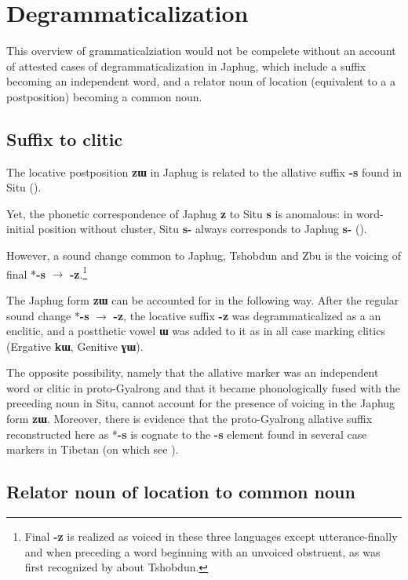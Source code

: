 \documentclass[oldfontcommands,oneside,a4paper,11pt]{article}
\newcommand{\ipa}[1]{\mbox{\phon\textbf{#1}}} %
\newcommand{\change}[2]{*\ipa{#1} $\rightarrow$ \ipa{#2}}
\begin{document}
 \section{Degrammaticalization}
 This overview of grammaticalziation would not be compelete without an account of attested cases of degrammaticalization in Japhug, which include a suffix  becoming an independent word, and a relator noun of location (equivalent to a a postposition) becoming a common noun.
 
 
 \subsection{Suffix to clitic}
The locative postposition  \ipa{zɯ} in Japhug is related to the allative suffix \ipa{-s} found in Situ (\citealt[330]{linxr93jiarong}).  

Yet, the phonetic correspondence of Japhug \ipa{z} to Situ \ipa{s} is anomalous: in word-initial position without cluster, Situ \ipa{s-} always corresponds to Japhug \ipa{s-}  (\citealt[317-8]{jacques04these}).

However, a sound change common to Japhug, Tshobdun and Zbu is the voicing of final \change{-s}{-z}.\footnote{Final \ipa{-z} is realized as voiced in these three languages except utterance-finally and when preceding a word beginning with an unvoiced obstruent, as was first recognized by  \citet{jackson05yingao} about Tshobdun.} 

The Japhug form \ipa{zɯ} can be accounted for in the following way. After the regular sound change \change{-s}{-z}, the locative suffix \ipa{-z} was degrammaticalized as a an enclitic, and a postthetic vowel \ipa{ɯ} was added to it as in all case marking clitics (Ergative \ipa{kɯ}, Genitive \ipa{ɣɯ}). 

 The opposite possibility, namely that the allative marker was an independent word or clitic in proto-Gyalrong and that it became phonologically fused with the preceding noun in Situ, cannot account for the presence of voicing in the Japhug form \ipa{zɯ}. Moreover, there is evidence that the proto-Gyalrong allative suffix reconstructed here as *\ipa{-s} is cognate to the \ipa{-s} element found in several case markers in Tibetan (on which see \citealt{hill12bas}).
  

 \subsection{Relator noun of location to common noun}
\end{document}
